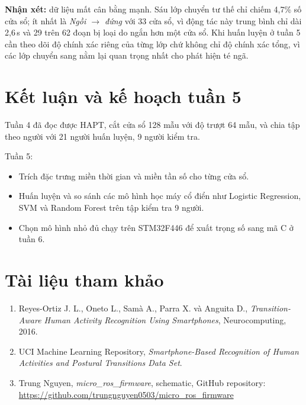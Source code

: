 \documentclass[12pt,a4paper]{article}
\begin{document}
\textbf{Nhận xét:} dữ liệu mất cân bằng mạnh. Sáu lớp chuyển tư thế chỉ chiếm 4,7\% số cửa sổ; ít nhất là \textit{Ngồi $\to$ đứng} với 33 cửa sổ, vì động tác này trung bình chỉ dài 2,6\,s và 29 trên 62 đoạn bị loại do ngắn hơn một cửa sổ. Khi huấn luyện ở tuần 5 cần theo dõi độ chính xác riêng của từng lớp chứ không chỉ độ chính xác tổng, vì các lớp chuyển sang nằm lại quan trọng nhất cho phát hiện té ngã.

\section{Kết luận và kế hoạch tuần 5}
Tuần 4 đã đọc được HAPT, cắt cửa sổ 128 mẫu với độ trượt 64 mẫu, và chia tập theo người với 21 người huấn luyện, 9 người kiểm tra.

Tuần 5:
\begin{itemize}[leftmargin=*, itemsep=0pt]
  \item Trích đặc trưng miền thời gian và miền tần số cho từng cửa sổ.
  \item Huấn luyện và so sánh các mô hình học máy cổ điển như Logistic Regression, SVM và Random Forest trên tập kiểm tra 9 người.
  \item Chọn mô hình nhỏ đủ chạy trên STM32F446 để xuất trọng số sang mã C ở tuần 6.
\end{itemize}

\section*{Tài liệu tham khảo}
\begin{enumerate}[label={\arabic*.}, leftmargin=*, itemsep=0pt]
  \item Reyes-Ortiz J. L., Oneto L., Samà A., Parra X. và Anguita D., \textit{Transition-Aware Human Activity Recognition Using Smartphones}, Neurocomputing, 2016.
  \item UCI Machine Learning Repository, \textit{Smartphone-Based Recognition of Human Activities and Postural Transitions Data Set}.
  \item Trung Nguyen, \textit{micro\_ros\_firmware}, schematic, GitHub repository: \url{https://github.com/trungnguyen0503/micro_ros_firmware}
\end{enumerate}
\end{document}
